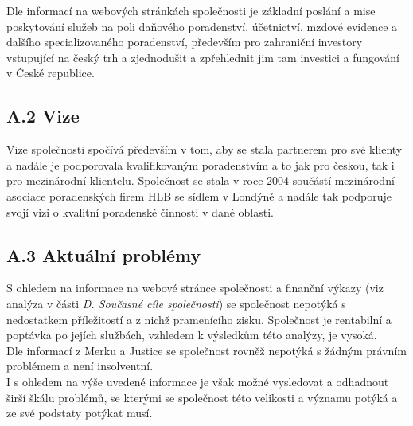 Dle informací na webových stránkách společnosti je základní poslání a mise poskytování služeb na poli daňového poradenství, účetnictví, mzdové evidence a dalšího specializovaného poradenství, především pro zahraniční investory vstupující na český trh a zjednodušit a zpřehlednit jim tam investici a fungování v České republice. 

\subsection*{A.2 Vize}
\label{sec:Vize}

Vize společnosti spočívá především v tom, aby se stala partnerem pro své klienty a nadále je podporovala kvalifikovaným poradenstvím a to jak pro českou, tak i pro mezinárodní klientelu. Společnost se stala v roce 2004 součástí mezinárodní asociace poradenských firem HLB se sídlem v Londýně a nadále tak podporuje svojí vizi o kvalitní poradenské činnosti v dané oblasti.

\subsection*{A.3 Aktuální problémy}
\label{sec:Problemy}




S ohledem na informace na webové stránce společnosti a finanční výkazy (viz analýza v části \textit{D. Současné cíle společnosti}) se společnost nepotýká s nedostatkem příležitostí a z nichž pramenícího zisku. Společnost je rentabilní a poptávka po jejích službách, vzhledem k výsledkům této analýzy, je vysoká.\\

Dle informací z Merku a Justice se společnost rovněž nepotýká s žádným právním problémem a není insolventní.\\


I s ohledem na výše uvedené informace je však možné vysledovat a odhadnout širší škálu problémů, se kterými se společnost této velikosti a významu potýká a ze své podstaty potýkat musí.\\

